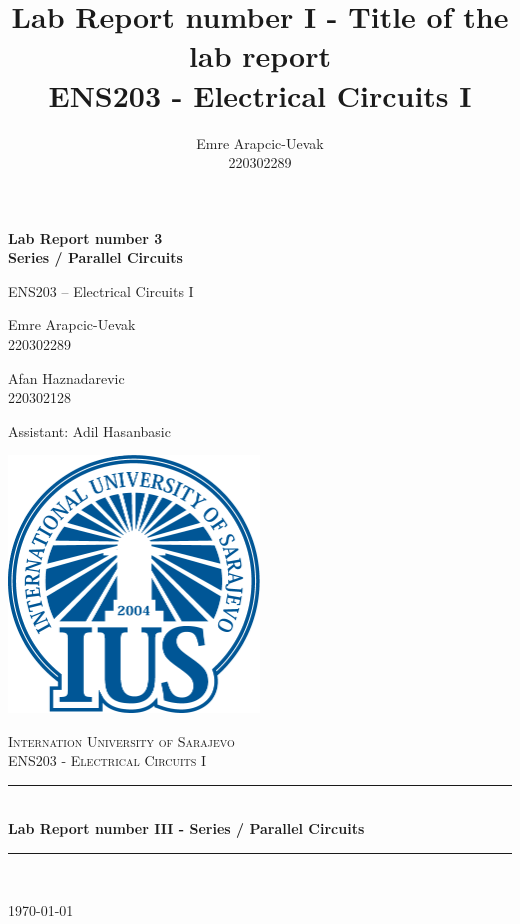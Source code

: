 \documentclass[a4paper, 10pt]{article}
\title{Lab Report number I - Title of the lab report\\
	ENS203 - Electrical Circuits I}
\author{Emre Arapcic-Uevak\\220302289}
\date{}
\begin{document}
	\begin{titlepage}
		\begin{center}

			{\Large\bfseries Lab Report number 3 \\[0.5em] Series / Parallel Circuits\par}
			\vspace{1cm} %

			{\large ENS203 – Electrical Circuits I\par}
			\vspace{1cm} %

			{\large Emre Arapcic-Uevak \\ 220302289\par}
			\vspace{.3cm} %
			{\large Afan Haznadarevic \\ 220302128\par}
			\vspace{1cm} %

			{\large Assistant: Adil Hasanbasic\par}
			\includegraphics[width=0.5\textwidth]{Logo.png}
			\vspace{5mm}
			
			\textsc{\LARGE Internation University of Sarajevo}\\[1.5cm]
			\textsc{\Large ENS203 - Electrical Circuits I}\\[0.5cm]
			
			\rule{\linewidth}{0.5mm} \\[0.4cm]
			{ \huge \bfseries Lab Report number III - Series / Parallel Circuits}\\[0.4cm]
			\rule{\linewidth}{0.5mm} \\[1.5cm]
			
			\vfill
			
			{\large \today}
		\end{center}
	\end{titlepage}
	\pagebreak
\end{document}
